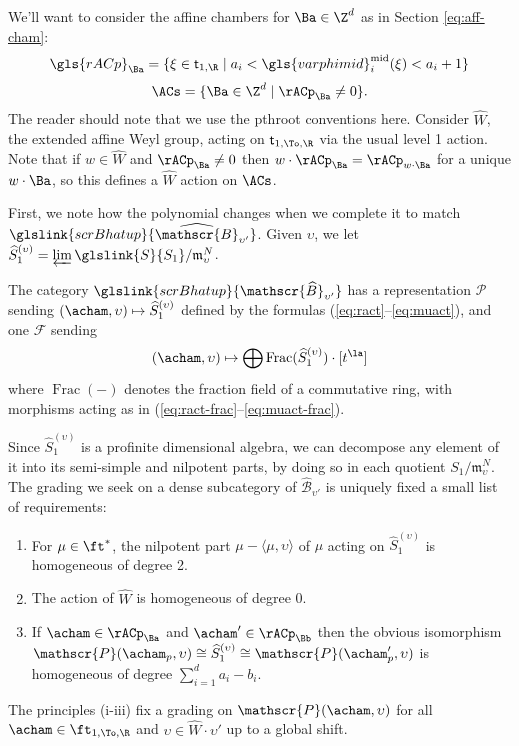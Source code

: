 We'll want to consider the affine chambers for $\Ba\in \Z^{d}$ as in Section \ref{eq:aff-cham}: 
\[\gls{rACp}_{\Ba}=\{\xi \in \mathsf{t}_{1,\R}\mid a_i<\gls{varphimid}_i^{\operatorname{mid}}(\xi)<a_i+1\}\label{eq:r-aff-cham}\]  
\[\ACs=\{\Ba\in \Z^{d}\mid \rACp_{\Ba}\neq 0\}.\] 
  The reader should note that we use the \gls{pthroot} conventions here.
Consider $\widehat{W}$, the extended affine Weyl group, acting on
$\mathsf{t}_{1,\To,\R}$ via the usual level 1 action. Note that if $w\in
\widehat{W}$ and $\rACp_{\Ba}\neq 0$ then $w\cdot
\rACp_{\Ba}=\rACp_{w\cdot \Ba}$ for a unique $w\cdot \Ba$, so this
defines a $\widehat{W}$ action on $\ACs$.

First, we note how the polynomial changes when we complete it to match
$\glslink{scrBhatup}{\widehat{\mathscr{B}}_{\upsilon'}}$.  
Given $\upsilon$, we
let $\widehat{S}^{(\upsilon)}_1=\varprojlim
\glslink{S}{S_1}/\mathfrak{m}_\upsilon^N$.

\begin{proposition}\label{prop:hat-rep}
  The category $\glslink{scrBhatup}{\mathscr{\widehat{B}}_{\upsilon'}}$ has a 
  representation $\mathscr{P}$ sending $(\acham, \upsilon) \mapsto
  \widehat{S}^{(\upsilon)}_1$ defined by the formulas (\ref{eq:ract}--\ref{eq:muact}), and one $\mathscr{F}$ sending 
  \[(\acham, \upsilon)\mapsto \bigoplus \operatorname{Frac}( \widehat{S}^{(\upsilon)}_1)\cdot [t^\la] \]
  where $\operatorname{Frac}(-)$ denotes the fraction field of a commutative ring, with morphisms acting as in (\ref{eq:ract-frac}--\ref{eq:muact-frac}).
\end{proposition}
Since $\widehat{S}^{(\upsilon)}_1$ is a profinite dimensional algebra,
we can decompose any element of it into its semi-simple and nilpotent
parts, by doing so in each quotient $S_1/\mathfrak{m}_\upsilon^N$.
The grading we seek on a dense subcategory of  $\widehat{\mathscr{B}}_{\upsilon'}$ is uniquely
fixed a small list of  requirements:
\begin{enumerate}[label=(\roman*)]
\item For $\mu \in \ft^*$, the nilpotent part $\mu-\langle\mu,\upsilon\rangle$ of $\mu$
  acting on $\widehat{S}^{(\upsilon)}_1$ is homogeneous of degree 2.
\item The action of $\widehat{W}$ is homogeneous of degree 0.
\item If $\acham\in \rACp_{\Ba}$ and $\acham'\in \rACp_{\Bb}$ then the
  obvious isomorphism   $\mathscr{P}(\acham_p,\upsilon)\cong \widehat{S}^{(\upsilon)}_1\cong \mathscr{P}(\acham'_p,\upsilon)$
is homogeneous of degree $\sum_{i=1}^d a_i-b_i$.
\end{enumerate}
The principles (i-iii) fix a grading on $\mathscr{P}(\acham,\upsilon)$
for all $\acham\in \ft_{1,\To,\R}$ and $\upsilon\in \hat{W}\cdot
\upsilon'$ up to a global shift. 


